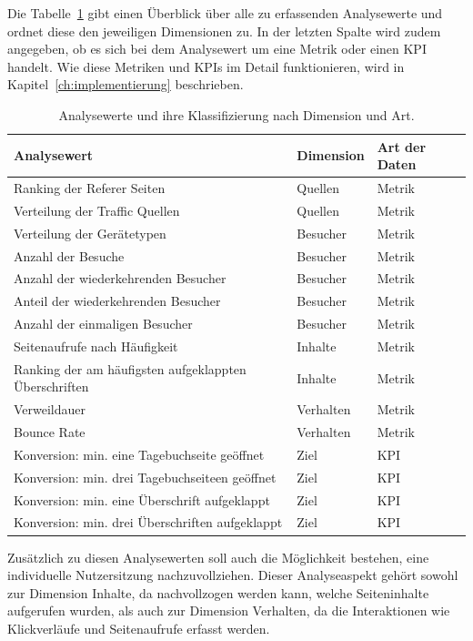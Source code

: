 Die Tabelle~\ref{tab:analysewerte} gibt einen Überblick über alle zu erfassenden Analysewerte und ordnet diese den jeweiligen Dimensionen zu. In der letzten Spalte wird zudem angegeben, ob es sich bei dem Analysewert um eine Metrik oder einen KPI handelt. Wie diese Metriken und KPIs im Detail funktionieren, wird in Kapitel~\ref{ch:implementierung} beschrieben.

\begin{table}[H]
    \centering
    \begin{tabularx}{\textwidth}{l l l}
        \hline
        \textbf{Analysewert} & \textbf{Dimension} & \textbf{Art der Daten} \\
        \hline
        Ranking der Referer Seiten & Quellen & Metrik \\
        Verteilung der Traffic Quellen & Quellen & Metrik \\
        Verteilung der Gerätetypen & Besucher & Metrik \\
        Anzahl der Besuche & Besucher & Metrik \\
        Anzahl der wiederkehrenden Besucher & Besucher & Metrik \\
        Anteil der wiederkehrenden Besucher & Besucher & Metrik \\
        Anzahl der einmaligen Besucher & Besucher & Metrik \\
        Seitenaufrufe nach Häufigkeit & Inhalte & Metrik \\
        Ranking der am häufigsten aufgeklappten Überschriften & Inhalte & Metrik \\
        Verweildauer & Verhalten & Metrik \\
        Bounce Rate & Verhalten & Metrik \\
        Konversion: min. eine Tagebuchseite geöffnet & Ziel & KPI \\
        Konversion: min. drei Tagebuchseiteen geöffnet & Ziel & KPI \\
        Konversion: min. eine Überschrift aufgeklappt & Ziel & KPI \\
        Konversion: min. drei Überschriften aufgeklappt & Ziel & KPI \\
        \hline
    \end{tabularx}
    \caption{Analysewerte und ihre Klassifizierung nach Dimension und Art.}
    \label{tab:analysewerte}
\end{table}

Zusätzlich zu diesen Analysewerten soll auch die Möglichkeit bestehen, eine individuelle Nutzersitzung nachzuvollziehen. Dieser Analyseaspekt gehört sowohl zur Dimension Inhalte, da nachvollzogen werden kann, welche Seiteninhalte aufgerufen wurden, als auch zur Dimension Verhalten, da die Interaktionen wie Klickverläufe und Seitenaufrufe erfasst werden.

